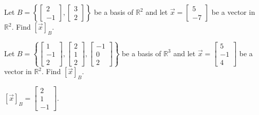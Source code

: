 \documentclass{ximera}
\begin{document}
\begin{problem}\label{prb:10.104}
Let $B = \left\{ \left[ \begin{array}{r}
2 \\
-1
\end{array} \right], \left[ \begin{array}{r}
3 \\
2
\end{array} \right] \right\}$ be a basis of $\mathbb{R}^2$ and let $\vec{x} = \left[
\begin{array}{r}
5 \\
-7
\end{array}
\right]$ be a vector in $\mathbb{R}^2$. Find $[\vec{x}]_B$.
\end{problem}

\begin{problem}\label{prb:10.105}
Let $B = \left\{ \left[ \begin{array}{r}
1 \\
-1 \\
2
\end{array} \right], \left[ \begin{array}{r}
2 \\
1 \\
2
 \end{array} \right], \left[ \begin{array}{r}
-1 \\
0 \\
2
\end{array} \right] \right\}$
be a basis of $\mathbb{R}^3$ and let $\vec{x} = \left[
\begin{array}{r}
5 \\
-1 \\
4
\end{array}
\right]$ be a vector in $\mathbb{R}^2$. Find $[\vec{x}]_B$.
\begin{hint}
 $[\vec{x}]_B =
\left[ \begin{array}{r}
2 \\
1 \\
-1
 \end{array} \right] $.
\end{hint}
\end{problem}
\end{document}
